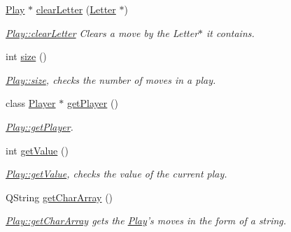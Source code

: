 \begin{DoxyCompactItemize}
\hyperlink{class_play}{Play} $\ast$ \hyperlink{class_play_a034c9cc986629045cdfcdbdeaabb2ab4}{clear\-Letter} (\hyperlink{class_letter}{Letter} $\ast$)
\begin{DoxyCompactList}\small\item\em \hyperlink{class_play_a034c9cc986629045cdfcdbdeaabb2ab4}{Play\-::clear\-Letter} Clears a move by the Letter$\ast$ it contains. \end{DoxyCompactList}\item 
int \hyperlink{class_play_a2311eaa432738b08a75d7ca35af46ba6}{size} ()
\begin{DoxyCompactList}\small\item\em \hyperlink{class_play_a2311eaa432738b08a75d7ca35af46ba6}{Play\-::size}, checks the number of moves in a play. \end{DoxyCompactList}\item 
class \hyperlink{class_player}{Player} $\ast$ \hyperlink{class_play_aebe81c706ee1005b63fad43f2eaff0c0}{get\-Player} ()
\begin{DoxyCompactList}\small\item\em \hyperlink{class_play_aebe81c706ee1005b63fad43f2eaff0c0}{Play\-::get\-Player}. \end{DoxyCompactList}\item 
int \hyperlink{class_play_af2599835f6eba8136770a4f773a9f9ef}{get\-Value} ()
\begin{DoxyCompactList}\small\item\em \hyperlink{class_play_af2599835f6eba8136770a4f773a9f9ef}{Play\-::get\-Value}, checks the value of the current play. \end{DoxyCompactList}\item 
Q\-String \hyperlink{class_play_a609ee8aa7d127a27ace83fa47b1478a9}{get\-Char\-Array} ()
\begin{DoxyCompactList}\small\item\em \hyperlink{class_play_a609ee8aa7d127a27ace83fa47b1478a9}{Play\-::get\-Char\-Array} gets the \hyperlink{class_play}{Play}'s moves in the form of a string. \end{DoxyCompactList}\end{DoxyCompactItemize}
